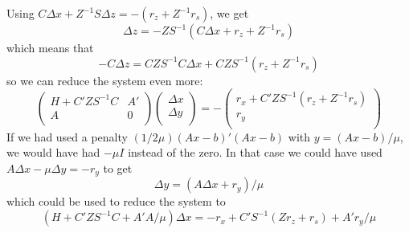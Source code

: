 \documentclass{article}
\begin{document}
Using $C \Delta x + Z^{-1} S \Delta z = - (r_z + Z^{-1} r_s)$, we get
\[
\Delta z = -Z S^{-1} (C \Delta x + r_z + Z^{-1} r_s)
\]
which means that
\[
-C \Delta z = C Z S^{-1} C \Delta x + CZS^{-1} (r_z + Z^{-1} r_s)
\]
so we can reduce the system even more:
\[
\left(
\begin{array}{cccc}
H + C' ZS^{-1}C& A' \\
A & 0 \\
\end{array}
\right)
\left(
\begin{array}{c}
\Delta x\\
\Delta y\\
\end{array}
\right)
=
-\left(
\begin{array}{c}
r_x + C' Z S^{-1} (r_z + Z^{-1} r_s)\\
r_y \\
\end{array}
\right)
\]
If we had used a penalty $(1/2\mu) (Ax - b)' (Ax - b)$ with $y = (Ax-b)/\mu$, we would have had $-\mu I$ instead of the zero. In that case we could have used $A \Delta x - \mu \Delta y = - r_y$ to get
\[
\Delta y = (A \Delta x + r_y) / \mu
\]
which could be used to reduce the system to
\[
(H + C' Z S^{-1} C + A' A / \mu) \Delta x= - r_x  + C' S^{-1}(Z r_z + r_s)  + A' r_y / \mu

\]
\end{document}
